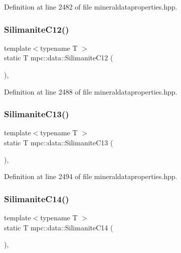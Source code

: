 Definition at line 2482 of file mineraldataproperties.\+hpp.

\mbox{\label{namespacempc_1_1data_a0397484ed7dff59be86101d522727ff7}} 
\subsubsection{\texorpdfstring{Silimanite\+C12()}{SilimaniteC12()}}
{\footnotesize\ttfamily template$<$typename T $>$ \\
static T mpc\+::data\+::\+Silimanite\+C12 (\begin{DoxyParamCaption}{ }\end{DoxyParamCaption})\hspace{0.3cm}{\ttfamily [inline]}, {\ttfamily [static]}}



Definition at line 2488 of file mineraldataproperties.\+hpp.

\mbox{\label{namespacempc_1_1data_a4e25a14210d22ed424934847ea4c69b2}} 
\subsubsection{\texorpdfstring{Silimanite\+C13()}{SilimaniteC13()}}
{\footnotesize\ttfamily template$<$typename T $>$ \\
static T mpc\+::data\+::\+Silimanite\+C13 (\begin{DoxyParamCaption}{ }\end{DoxyParamCaption})\hspace{0.3cm}{\ttfamily [inline]}, {\ttfamily [static]}}



Definition at line 2494 of file mineraldataproperties.\+hpp.

\mbox{\label{namespacempc_1_1data_ad0ed86e6150b861deed2f8486b19696a}} 
\subsubsection{\texorpdfstring{Silimanite\+C14()}{SilimaniteC14()}}
{\footnotesize\ttfamily template$<$typename T $>$ \\
static T mpc\+::data\+::\+Silimanite\+C14 (\begin{DoxyParamCaption}{ }\end{DoxyParamCaption})\hspace{0.3cm}{\ttfamily [inline]}, {\ttfamily [static]}}



